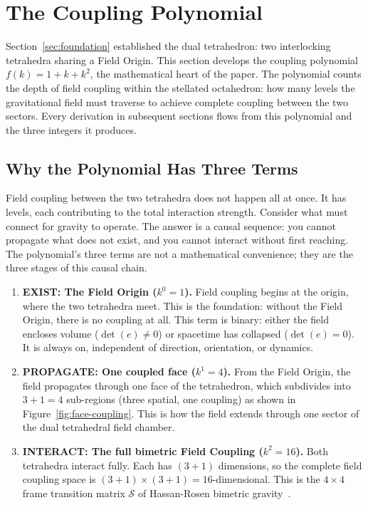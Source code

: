 \documentclass[aps,prd,preprint,superscriptaddress,showpacs,preprintnumbers,amsmath,amssymb,nofootinbib]{revtex4-2}
\begin{document}
\section{The Coupling Polynomial}
\label{sec:polynomial}

Section~\ref{sec:foundation} established the dual tetrahedron: two interlocking tetrahedra sharing a Field Origin. This section develops the coupling polynomial $f(k) = 1 + k + k^2$, the mathematical heart of the paper. The polynomial counts the depth of field coupling within the stellated octahedron: how many levels the gravitational field must traverse to achieve complete coupling between the two sectors. Every derivation in subsequent sections flows from this polynomial and the three integers it produces.

\subsection{Why the Polynomial Has Three Terms}
\label{subsec:hierarchy}

Field coupling between the two tetrahedra does not happen all at once. It has levels, each contributing to the total interaction strength. Consider what must connect for gravity to operate. The answer is a causal sequence: you cannot propagate what does not exist, and you cannot interact without first reaching. The polynomial's three terms are not a mathematical convenience; they are the three stages of this causal chain.

\begin{enumerate}
\item \textbf{EXIST: The Field Origin ($k^0 = 1$).} Field coupling begins at the origin, where the two tetrahedra meet. This is the foundation: without the Field Origin, there is no coupling at all. This term is binary: either the field encloses volume ($\det(e) \neq 0$) or spacetime has collapsed ($\det(e) = 0$). It is always on, independent of direction, orientation, or dynamics.

\item \textbf{PROPAGATE: One coupled face ($k^1 = 4$).} From the Field Origin, the field propagates through one face of the tetrahedron, which subdivides into $3 + 1 = 4$ sub-regions (three spatial, one coupling) as shown in Figure~\ref{fig:face-coupling}. This is how the field extends through one sector of the dual tetrahedral field chamber.

\item \textbf{INTERACT: The full bimetric Field Coupling ($k^2 = 16$).} Both tetrahedra interact fully. Each has $(3{+}1)$ dimensions, so the complete field coupling space is $(3{+}1) \times (3{+}1) = 16$-dimensional. This is the $4 \times 4$ frame transition matrix $\mathcal{S}$ of Hassan-Rosen bimetric gravity~\cite{hassan2012}.
\end{enumerate}
\end{document}
